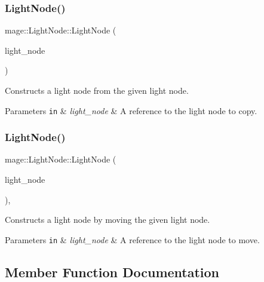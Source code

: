 \subsubsection{\texorpdfstring{Light\+Node()}{LightNode()}\hspace{0.1cm}{\footnotesize\ttfamily [2/3]}}
{\footnotesize\ttfamily mage\+::\+Light\+Node\+::\+Light\+Node (\begin{DoxyParamCaption}\item[{const \hyperlink{classmage_1_1_light_node}{Light\+Node} \&}]{light\+\_\+node }\end{DoxyParamCaption})\hspace{0.3cm}{\ttfamily [protected]}}

Constructs a light node from the given light node.


\begin{DoxyParams}[1]{Parameters}
\mbox{\tt in}  & {\em light\+\_\+node} & A reference to the light node to copy. \\
\hline
\end{DoxyParams}
\hypertarget{classmage_1_1_light_node_a0a2d5ee9e6417d73905d6f35116eccb3}{}\label{classmage_1_1_light_node_a0a2d5ee9e6417d73905d6f35116eccb3} 
\subsubsection{\texorpdfstring{Light\+Node()}{LightNode()}\hspace{0.1cm}{\footnotesize\ttfamily [3/3]}}
{\footnotesize\ttfamily mage\+::\+Light\+Node\+::\+Light\+Node (\begin{DoxyParamCaption}\item[{\hyperlink{classmage_1_1_light_node}{Light\+Node} \&\&}]{light\+\_\+node }\end{DoxyParamCaption})\hspace{0.3cm}{\ttfamily [protected]}, {\ttfamily [default]}}

Constructs a light node by moving the given light node.


\begin{DoxyParams}[1]{Parameters}
\mbox{\tt in}  & {\em light\+\_\+node} & A reference to the light node to move. \\
\hline
\end{DoxyParams}


\subsection{Member Function Documentation}
\hypertarget{classmage_1_1_light_node_a4d0c10f03de71cd497635feb431d02d5}{}\label{classmage_1_1_light_node_a4d0c10f03de71cd497635feb431d02d5} 
